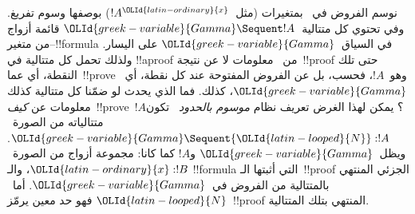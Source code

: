 \documentclass[../../../include/open-logic-section]{subfiles}
\begin{document}


نوسم الفروض في~ بمتغيرات (مثل~$!A^{\OLId{latin-ordinary}{x}}$) بوصفها وسوم تفريغ. وفي
 تحتوي كل متتالية~${\OLId{greek-variable}{Gamma}}\Sequent !A$ قائمة أزواج من
متغير--!!{formula} في السياق~${\OLId{greek-variable}{Gamma}}$ على اليسار. ولذلك تحمل كل متتالية في
!!a{proof} من~ معلومات لا عن نتيجة~!!{proof} حتى تلك النقطة، أي
عما~!!{prove} وهو~$!A$، فحسب، بل عن الفروض المفتوحة عند كل نقطة،
أي~${\OLId{greek-variable}{Gamma}}$، كذلك. فما الذي يحدث لو ضمّنا كل متتالية كذلك معلومات عن
\emph{كيف}~!!{prove}~$!A$؟ يمكن لهذا الغرض تعريف نظام \emph{موسوم
بالحدود}~ تكون متتالياته من الصورة~${\OLId{greek-variable}{Gamma}}\Sequent {\OLId{latin-looped}{N}}:!A$.
ويظل~${\OLId{greek-variable}{Gamma}}$ و$!A$ كما كانا: مجموعة أزواج من الصورة~${\OLId{latin-ordinary}{x}}:!B$، والـ
!!{formula} التي أثبتها الـ~!!{proof} الجزئي المنتهي بالمتتالية من الفروض
في~${\OLId{greek-variable}{Gamma}}$. أما~${\OLId{latin-looped}{N}}$ فهو حد معين يرمّز~!!{proof} المنتهي بتلك المتتالية.
\end{document}
